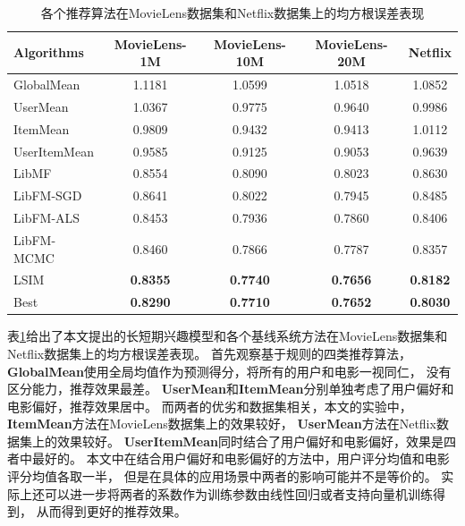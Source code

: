 \begin{table}[htbp]
    \centering
    \caption{各个推荐算法在MovieLens数据集和Netflix数据集上的均方根误差表现}
    \label{tab:msre}
    \begin{tabular}{|l|c|c|c|c|}
        \hline
        \textbf{Algorithms} & \textbf{MovieLens-1M} & \textbf{MovieLens-10M} & \textbf{MovieLens-20M} & \textbf{Netflix} \\
        \hline
        GlobalMean   & 1.1181          & 1.0599          & 1.0518          & 1.0852          \\
        UserMean     & 1.0367          & 0.9775          & 0.9640          & 0.9986          \\
        ItemMean     & 0.9809          & 0.9432          & 0.9413          & 1.0112          \\
        UserItemMean & 0.9585          & 0.9125          & 0.9053          & 0.9639          \\
        \hline
        LibMF        & 0.8554          & 0.8090          & 0.8023          & 0.8630          \\
        \hline
        LibFM-SGD    & 0.8641          & 0.8022          & 0.7945          & 0.8485          \\
        LibFM-ALS    & 0.8453          & 0.7936          & 0.7860          & 0.8406          \\
        LibFM-MCMC   & 0.8460          & 0.7866          & 0.7787          & 0.8357          \\
        \hline
        LSIM         & \textbf{0.8355} & \textbf{0.7740} & \textbf{0.7656} & \textbf{0.8182} \\
        \hline
        Best         & \textbf{0.8290} & \textbf{0.7710} & \textbf{0.7652} & \textbf{0.8030} \\
        \hline
    \end{tabular}
\end{table}

表\ref{tab:msre}给出了本文提出的长短期兴趣模型和各个基线系统方法在MovieLens数据集和Netflix数据集上的均方根误差表现。
首先观察基于规则的四类推荐算法，\textbf{GlobalMean}使用全局均值作为预测得分，将所有的用户和电影一视同仁，
没有区分能力，推荐效果最差。
\textbf{UserMean}和\textbf{ItemMean}分别单独考虑了用户偏好和电影偏好，推荐效果居中。
而两者的优劣和数据集相关，本文的实验中，\textbf{ItemMean}方法在MovieLens数据集上的效果较好，
\textbf{UserMean}方法在Netflix数据集上的效果较好。
\textbf{UserItemMean}同时结合了用户偏好和电影偏好，效果是四者中最好的。
本文中在结合用户偏好和电影偏好的方法中，用户评分均值和电影评分均值各取一半，
但是在具体的应用场景中两者的影响可能并不是等价的。
实际上还可以进一步将两者的系数作为训练参数由线性回归或者支持向量机训练得到，
从而得到更好的推荐效果。

